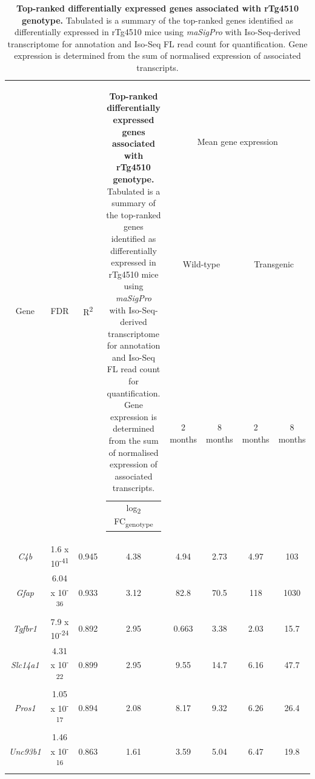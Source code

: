 \vspace{2cm}
\begin{table}[!htp]
	\centering
	\captionsetup{width=0.95\textwidth}
	\setlength\tabcolsep{3.5pt} %
	\caption[Top-ranked differentially expressed genes associated with rTg4510 genotype]%
	{\textbf{Top-ranked differentially expressed genes associated with rTg4510 genotype.} Tabulated is a summary of the top-ranked genes identified as differentially expressed in rTg4510 mice using \textit{maSigPro} with Iso-Seq-derived transcriptome for annotation and Iso-Seq FL read count for quantification. Gene expression is determined from the sum of normalised expression of associated transcripts.}
	\begin{threeparttable}
	\begin{tabularx}{0.95\textwidth}{cccccccc}
	\toprule
	\multirow{3}{*}{Gene} &
	\multirow{3}{*}{FDR\tnote{a}} &
	\multirow{3}{*}{R\textsuperscript{2}\tnote{,b}} &
	\multirow{3}{*}{\begin{tabular}[c]{@{}c@{}}log\textsubscript{2} FC\textsubscript{genotype}\tnote{c}\end{tabular}} &
	\multicolumn{4}{c}{Mean gene expression} \\ \cmidrule(l){5-8} 
	&          &       &      & \multicolumn{2}{c}{Wild-type} & \multicolumn{2}{c}{Transgenic} \\ \cmidrule(l){5-8} 
	&          &       &      & 2 months      & 8 months      & 2 months       & 8 months      \\ \midrule
	\textit{C4b}    & 1.6 x 10\textsuperscript{-41}  & 0.945 & 4.38 & 4.94          & 2.73          & 4.97           & 103           \\
	\textit{Gfap}     & 6.04 x 10\textsuperscript{-36} & 0.933 & 3.12  & 82.8          & 70.5          & 118            & 1030           \\
	\textit{Tgfbr1}  & 7.9 x 10\textsuperscript{-24}  & 0.892 & 2.95 & 0.663         & 3.38          & 2.03           & 15.7          \\
	\textit{Slc14a1} & 4.31 x 10\textsuperscript{-22} & 0.899 & 2.95 & 9.55          & 14.7          & 6.16           & 47.7            \\
	\textit{Pros1} & 1.05 x 10\textsuperscript{-17} & 0.894 & 2.08 & 8.17          & 9.32         & 6.26           & 26.4          \\
	\textit{Unc93b1} & 1.46 x 10\textsuperscript{-16} & 0.863 & 1.61  & 3.59          & 5.04          & 6.47          & 19.8          \\ \bottomrule

\end{tabularx}
\end{threeparttable}
\end{table}
